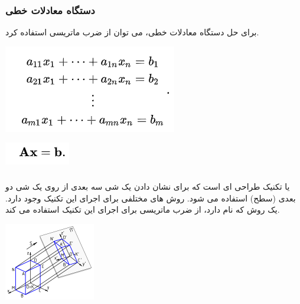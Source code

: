 \documentclass[12pt,titlepage,a4page , tikz , multi,table , svgnames,xcdraw]{article}
\begin{document}
\subsubsection{دستگاه معادلات خطی}
	برای حل دستگاه معادلات خطی، می توان از ضرب ماتریسی استفاده کرد.\cite{wikipedia}

\begin{center}
\includegraphics[scale=0.6]
    {Images/Introduction/EQ1.png}\\
\end{center}

\begin{center}
\includegraphics[scale=0.6]
    {Images/Introduction/EQ2.png}\\
\end{center}


\subsubsection{}
  یا 
تکنیک طراحی ای است که برای نشان دادن یک شی سه بعدی از روی یک شی دو بعدی (سطح) استفاده می شود. روش های مختلفی برای اجرای این تکنیک وجود دارد. یک روش که 
نام دارد، از ضرب ماتریسی برای اجرای این تکنیک استفاده می کند. \cite{wikipedia3DP}

\begin{center}
\includegraphics[scale=0.6]
    {Images/Introduction/3D_Projection.png}\\
\end{center}
\end{document}
